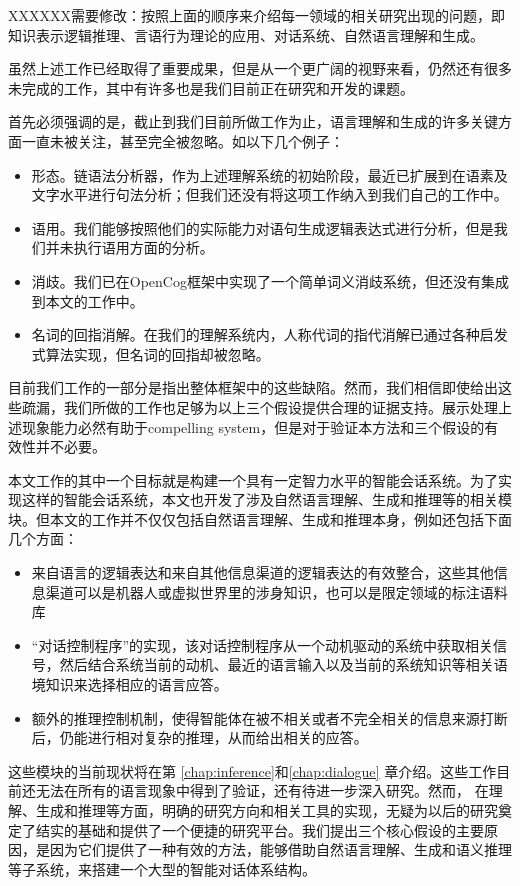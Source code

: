 XXXXXX需要修改：按照上面的顺序来介绍每一领域的相关研究出现的问题，即知识表示逻辑推理、言语行为理论的应用、对话系统、自然语言理解和生成。

虽然上述工作已经取得了重要成果，但是从一个更广阔的视野来看，仍然还有很多未完成的工作，其中有许多也是我们目前正在研究和开发的课题。

首先必须强调的是，截止到我们目前所做工作为止，语言理解和生成的许多关键方面一直未被关注，甚至完全被忽略。如以下几个例子：
\begin{itemize}
\item 形态。链语法分析器，作为上述理解系统的初始阶段，最近已扩展到在语素及文字水平进行句法分析；但我们还没有将这项工作纳入到我们自己的工作中。
\item 语用。我们能够按照他们的实际能力对语句生成逻辑表达式进行分析，但是我们并未执行语用方面的分析。
\item 消歧。我们已在OpenCog框架中实现了一个简单词义消歧系统，但还没有集成到本文的工作中。
\item 名词的回指消解。在我们的理解系统内，人称代词的指代消解已通过各种启发式算法实现，但名词的回指却被忽略。
\end{itemize}

目前我们工作的一部分是指出整体框架中的这些缺陷。然而，我们相信即使给出这些疏漏，我们所做的工作也足够为以上三个假设提供合理的证据支持。展示处理上述现象能力必然有助于compelling system，但是对于验证本方法和三个假设的有效性并不必要。

本文工作的其中一个目标就是构建一个具有一定智力水平的智能会话系统。为了实现这样的智能会话系统，本文也开发了涉及自然语言理解、生成和推理等的相关模块。但本文的工作并不仅仅包括自然语言理解、生成和推理本身，例如还包括下面几个方面：
\begin{itemize}
\item 来自语言的逻辑表达和来自其他信息渠道的逻辑表达的有效整合，这些其他信息渠道可以是机器人或虚拟世界里的涉身知识，也可以是限定领域的标注语料库
\item “对话控制程序”的实现，该对话控制程序从一个动机驱动的系统中获取相关信号，然后结合系统当前的动机、最近的语言输入以及当前的系统知识等相关语境知识来选择相应的语言应答。
\item 额外的推理控制机制，使得智能体在被不相关或者不完全相关的信息来源打断后，仍能进行相对复杂的推理，从而给出相关的应答。
\end{itemize}

这些模块的当前现状将在第 \ref{chap:inference}和\ref{chap:dialogue} 章介绍。这些工作目前还无法在所有的语言现象中得到了验证，还有待进一步深入研究。然而， 在理解、生成和推理等方面，明确的研究方向和相关工具的实现，无疑为以后的研究奠定了结实的基础和提供了一个便捷的研究平台。我们提出三个核心假设的主要原因，是因为它们提供了一种有效的方法，能够借助自然语言理解、生成和语义推理等子系统，来搭建一个大型的智能对话体系结构。

